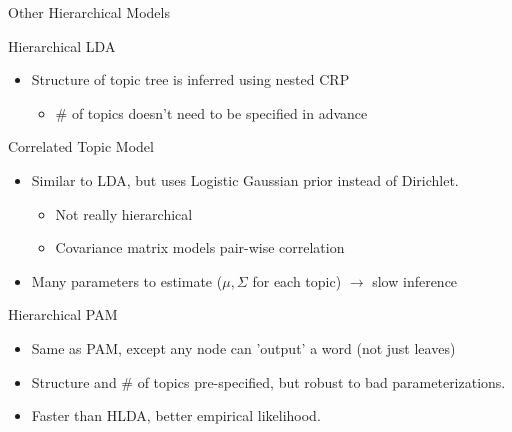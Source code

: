 \documentclass[10pt, svgnames]{beamer}
\begin{document}
\begin{frame}{Other Hierarchical Models}
	\begin{block}{Hierarchical LDA\cite{hlda}}
		\begin{itemize}
			\item Structure of topic tree is inferred using nested CRP
				\begin{itemize}
					\item \# of topics doesn't need to be specified in
				advance
				\end{itemize}
		\end{itemize}
	\end{block}
	\begin{block}{Correlated Topic Model\cite{ctm}}
		\begin{itemize}
			\item Similar to LDA, but uses Logistic
				Gaussian prior instead of Dirichlet.
				\begin{itemize}
					\item Not really hierarchical
					\item Covariance matrix models pair-wise correlation
				\end{itemize}
			\item Many parameters to estimate ($\mu,\Sigma$ for each topic)
				$\rightarrow$ slow inference
		\end{itemize}
	\end{block}
	\begin{block}{Hierarchical PAM\cite{hpam}}
		\begin{itemize}
			\item Same as PAM, except any node can 'output' a word (not just
				leaves)
			\item Structure and \# of topics pre-specified, but robust to bad
				parameterizations.
			\item Faster than HLDA, better empirical likelihood.
		\end{itemize}
	\end{block}
\end{frame}

\end{document}
